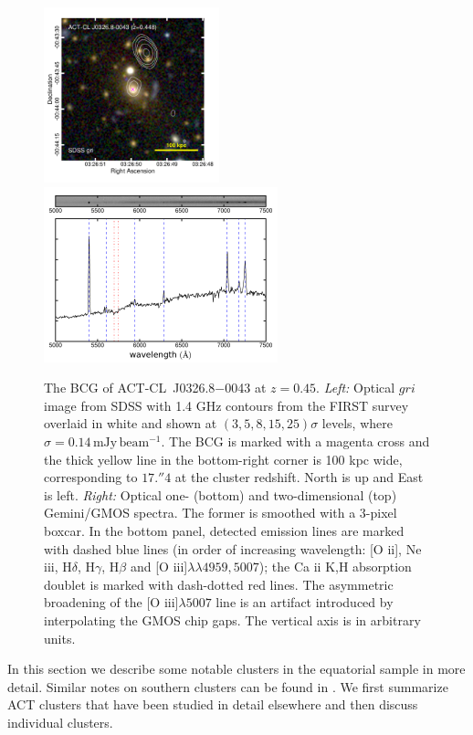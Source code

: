 \begin{figure}
 \centerline{\includegraphics[height=2in]{chapter3/ACT-CL_J03268-0043.pdf}
             \includegraphics[height=2in]{chapter3/J0326_BCG_spectrum.pdf}}
\caption{The BCG of ACT-CL~J0326.8$-$0043 at $z=0.45$. \textit{Left:} Optical $gri$ image from 
SDSS with 1.4 GHz contours from the FIRST survey overlaid in white and shown at 
$(3,5,8,15,25)\sigma$ levels, where $\sigma=0.14\,\mathrm{mJy\,beam^{-1}}$. The BCG is marked with 
a magenta cross and the thick yellow line in the bottom-right corner is 100 kpc wide, 
corresponding to $17.\!''4$ at the cluster redshift. North is up and East is left.
\textit{Right:} Optical one- (bottom) and 
two-dimensional (top) Gemini/GMOS spectra. The former is smoothed with a 3-pixel boxcar. In the 
bottom panel, detected emission lines are marked with dashed blue lines (in order of increasing 
wavelength: [O {\sc ii}], Ne {\sc iii}, H$\delta$, H$\gamma$, H$\beta$ and [O {\sc 
iii}]$\lambda\lambda4959,5007$); the Ca {\sc ii} K,H absorption doublet is marked with dash-dotted 
red lines. The asymmetric broadening of the [O {\sc iii}]$\lambda5007$ line is an artifact 
introduced by interpolating the GMOS chip gaps. The vertical axis is in arbitrary units.}
\label{f:J0326}
\end{figure}

In this section we describe some notable clusters in the equatorial sample in more detail. Similar 
notes on southern clusters can be found in \cite{sifon13}. We first summarize ACT clusters that 
have been studied in detail elsewhere and then discuss individual clusters.

